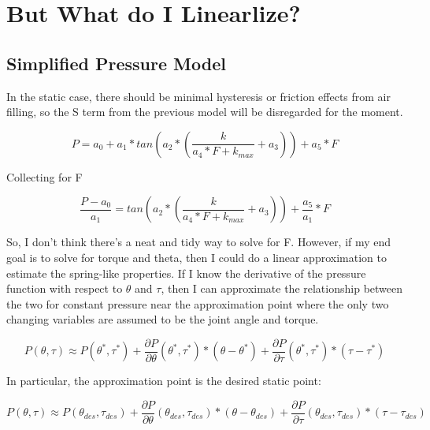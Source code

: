 \documentclass[12pt, letterpaper, oneside, notitlepage, onecolumn]{article}
\begin{document}
\section{But What do I Linearlize?}

\subsection{Simplified Pressure Model}

In the static case, there should be minimal hysteresis or friction effects from
air filling, so the S term from the previous model will be disregarded for the
moment.

\begin{equation}
P = a_{0} + a_{1} * tan(a_{2} * (\dfrac{k}{a_{4} * F + k_{max}} + a_{3})) + a_{5} * F
\end{equation}

Collecting for F

\begin{equation}
\dfrac{P - a_{0}}{a_{1}} = tan(a_{2} * (\dfrac{k}{a_{4} * F + k_{max}} + a_{3})) +
\dfrac{a_{5}}{a_{1}} * F
\end{equation}

So, I don't think there's a neat and tidy way to solve for F. However, if my end
goal is to solve for torque and theta, then I could do a linear approximation to
estimate the spring-like properties. If I know the derivative of the pressure
function with respect to $\theta$ and $\tau$, then I can approximate the
relationship between the two for constant pressure near the approximation point
where the only two changing variables are assumed to be the joint angle and
torque.

\begin{equation}
P(\theta, \tau) \approx P(\theta^{*}, \tau^{*}) +
\dfrac{\partial P}{\partial \theta}(\theta^{*}, \tau^{*}) * (\theta -\theta^{*}) +
\dfrac{\partial P}{\partial \tau}(\theta^{*}, \tau^{*}) * (\tau - \tau^{*})
\end{equation}

In particular, the approximation point is the desired static point:

\begin{equation}
P(\theta, \tau) \approx P(\theta_{des}, \tau_{des}) + 
\dfrac{\partial P}{\partial \theta}(\theta_{des}, \tau_{des}) * (\theta -\theta_{des}) +
\dfrac{\partial P}{\partial \tau}(\theta_{des}, \tau_{des}) * (\tau - \tau_{des})
\end{equation}
\end{document}
